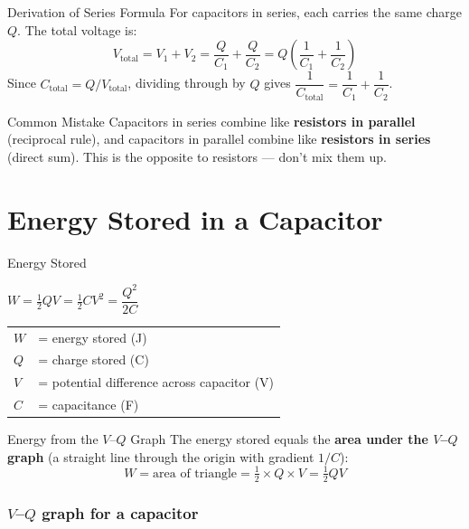 \begin{keybox}{Derivation of Series Formula}
For capacitors in series, each carries the same charge $Q$. The total voltage is:
$$V_{\text{total}} = V_1 + V_2 = \frac{Q}{C_1} + \frac{Q}{C_2} = Q\left(\frac{1}{C_1} + \frac{1}{C_2}\right)$$
Since $C_{\text{total}} = Q/V_{\text{total}}$, dividing through by $Q$ gives $\dfrac{1}{C_{\text{total}}} = \dfrac{1}{C_1} + \dfrac{1}{C_2}$.
\end{keybox}

\begin{warningbox}{Common Mistake}
Capacitors in series combine like \textbf{resistors in parallel} (reciprocal rule), and capacitors in parallel combine like \textbf{resistors in series} (direct sum). This is the opposite to resistors — don't mix them up.
\end{warningbox}

\section{Energy Stored in a Capacitor}

\begin{formulabox}{Energy Stored}
\begin{center}
\Large $W = \tfrac{1}{2}QV = \tfrac{1}{2}CV^2 = \dfrac{Q^2}{2C}$
\end{center}
\vspace{0.3em}
\begin{tabular}{@{}ll@{}}
$W$ & = energy stored (J) \\
$Q$ & = charge stored (C) \\
$V$ & = potential difference across capacitor (V) \\
$C$ & = capacitance (F) \\
\end{tabular}
\end{formulabox}

\begin{keybox}{Energy from the $V$–$Q$ Graph}
The energy stored equals the \textbf{area under the $V$–$Q$ graph} (a straight line through the origin with gradient $1/C$):
$$W = \text{area of triangle} = \tfrac{1}{2} \times Q \times V = \tfrac{1}{2}QV$$
\end{keybox}

\subsubsection*{$V$–$Q$ graph for a capacitor}

